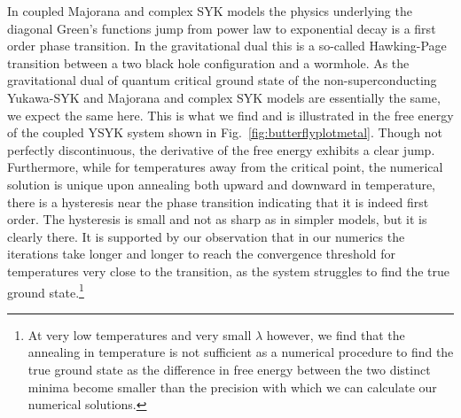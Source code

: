 In  coupled Majorana \cite{maldacena2018eternal,pluggeRevivalDynamicsTraversable2020a} and complex SYK models \cite{sahooTraversableWormholeHawkingPage2020} the physics underlying the diagonal Green's functions jump from power law to exponential decay is a first order phase transition. In the gravitational dual this is a so-called Hawking-Page transition between a two black hole configuration and a wormhole.
%
As the gravitational dual of quantum critical ground state of the non-superconducting Yukawa-SYK and Majorana and complex SYK models are essentially the same, we expect the same here. This is what we find and is illustrated in the free energy of the coupled YSYK system shown in  Fig.~\ref{fig:butterflyplotmetal}. 
Though not perfectly discontinuous, the derivative of the free energy exhibits a clear jump. Furthermore, while for temperatures away from the critical point, the numerical solution is unique upon annealing both upward and downward in temperature, there is a hysteresis near the phase transition indicating that it is indeed first order. The hysteresis is small and not as sharp as in simpler models, but it is clearly there. 
It is supported by our observation that in our numerics
the iterations take longer and longer to reach the convergence threshold for temperatures very close to the transition, as the system struggles to find the true ground state.\footnote{At very low temperatures and very small $\lambda$ however, we find that the annealing in temperature is not sufficient as a numerical procedure to find the true ground state as the difference in free energy between the two distinct minima become smaller than the precision with which we can calculate our numerical solutions. 
}

